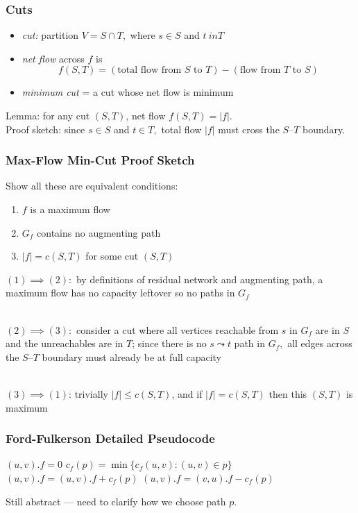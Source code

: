\documentclass[10pt,aspectratio=169]{beamer}
\newcommand{\stanza}{ \\~\ }
\begin{document}
\begin{frame} \frametitle{Cuts}
\begin{itemize}
  \item \emph{cut:} partition $V=S \cap T,$ where $s \in S$ and $t \ in T$
  \item \emph{net flow} across $f$ is
    \[ f(S, T) = (\text{total flow from } S \text{ to } T) -
                  (\text{flow from } T \text{ to } S) \]
  \item \emph{minimum cut} = a cut whose net flow is minimum
\end{itemize}
\vspace{.5cm}

Lemma: for any cut $(S, T)$, net flow $f(S,T) = |f|.$ \\
Proof sketch: since $s \in S$ and $t \in T,$ total flow $|f|$ must cross the
$S$--$T$ boundary.
\end{frame}

\begin{frame} \frametitle{Max-Flow Min-Cut Proof Sketch}
Show all these are equivalent conditions:
\begin{enumerate}
  \item $f$ is a maximum flow
  \item $G_f$ contains no augmenting path
  \item $|f| = c(S, T)$ for some cut $(S, T)$
\end{enumerate}

$(1) \implies (2):$ by definitions of residual network and augmenting path,
a maximum flow has no capacity leftover so no paths in $G_f$ \stanza

$(2) \implies (3):$ consider a cut where all vertices reachable from $s$ in $G_f$
are in $S$ and the unreachables are in $T$; since there is no $s \leadsto t$
path in $G_f,$ all edges across the $S$--$T$ boundary must already be at full capacity
\stanza

$(3) \implies (1)$: trivially $|f| \leq c(S, T)$, and if $|f|=c(S, T)$ then this
$(S, T)$ is maximum
\end{frame}

\begin{frame} \frametitle{Ford-Fulkerson Detailed Pseudocode}
{\footnotesize
\begin{algorithmic}[1]
    \State $(u, v).f = 0$
  \EndFor
    \State $c_f(p) = \min\{c_f(u, v) : (u, v) \in p\}$
        \State $(u, v).f = (u, v).f + c_f(p)$
      \Else
        \State $(u, v).f = (v, u).f - c_f(p)$
      \EndIf
    \EndFor
  \EndWhile
  \State {}
  \EndFunction
\end{algorithmic}
}
Still abstract --- need to clarify how we choose path $p.$
\end{frame}
\end{document}
